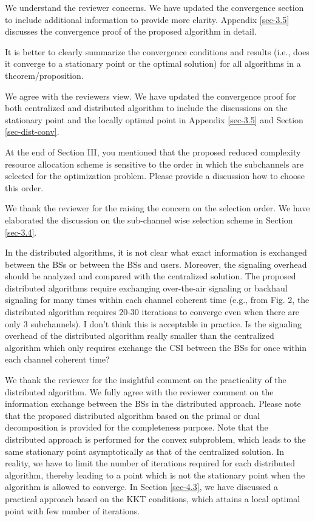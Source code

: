 \begin{itemize}
\resp We understand the reviewer concerns. We have updated the convergence section to include additional information to provide more clarity. Appendix \ref{sec-3.5} discusses the convergence proof of the proposed algorithm in detail.

 It is better to clearly summarize the convergence conditions and results (i.e., does it converge to a stationary point or the optimal solution) for all algorithms in a theorem/proposition.

\resp We agree with the reviewers view. We have updated the convergence proof for both centralized and distributed algorithm to include the discussions on the stationary point and the locally optimal point in Appendix \ref{sec-3.5} and Section \ref{sec-dist-conv}.

 At the end of Section III, you mentioned that the proposed reduced complexity resource allocation scheme is sensitive to the order in which the subchannels are selected for the optimization problem. Please provide a discussion how to choose this order.

\resp We thank the reviewer for the raising the concern on the selection order. We have elaborated the discussion on the sub-channel wise selection scheme in Section \ref{sec-3.4}. 

 In the distributed algorithms, it is not clear what exact information is exchanged between the BSs or between the BSs and users. Moreover, the signaling overhead should be analyzed and compared with the centralized solution. The proposed distributed algorithms require exchanging over-the-air signaling or backhaul signaling for many times within each channel coherent time (e.g., from Fig. 2, the distributed algorithm requires 20-30 iterations to converge even when there are only 3 subchannels). I don’t think this is acceptable in practice. Is the signaling overhead of the distributed algorithm really smaller than the centralized algorithm which only requires exchange the CSI between the BSs for once within each channel coherent time?

\resp We thank the reviewer for the insightful comment on the practicality of the distributed algorithm. We fully agree with the reviewer comment on the information exchange between the BSs in the distributed approach. Please note that the proposed distributed algorithm based on the primal or dual decomposition is provided for the completeness purpose. Note that the distributed approach is performed for the convex subproblem, which leads to the same stationary point asymptotically as that of the centralized solution. In reality, we have to limit the number of iterations required for each distributed algorithm, thereby leading to a point which is not the stationary point when the algorithm is allowed to converge. In Section \ref{sec-4.3}, we have discussed a practical approach based on the KKT conditions, which attains a local optimal point with few number of iterations.


\end{itemize}

